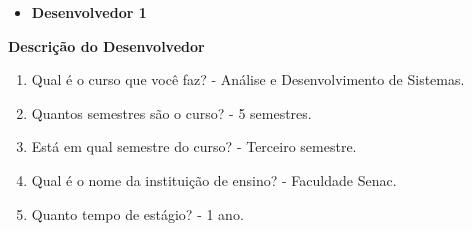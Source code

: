 \begin{anexosenv}
\begin{comment}
\begin{enumerate}
\setcounter{enumi}{25}
\item Como você testa as suas aplicações?\newline
- Resposta 1
\item Você costuma testar todas as páginas de aplicação que desenvolve?\newline
- Resposta 2
\item Você costuma armazenar os resultados dos testes que realiza?\newline
- Resposta 3
\item Você costuma a elaborar casos de testes para sua aplicação?\newline
- Resposta 4
\item Seria bom testes automatizados de interface para sua aplicação (selenium)?\newline
- Resposta 5
\end{enumerate}

\textbf{Implantação}

\begin{enumerate}
\setcounter{enumi}{30}
\item Você costuma migrar as definições dos objetos de banco (tabelas, sequences, views e
etc) junto com a aplicação?\newline
- Resposta 1
\item Você costuma verificar se os apelidos da aplicação de desenvolvimento e produção
estão iguais?\newline
- Resposta 2
\item Realiza uma navegação por todas as páginas da aplicação?\newline
- Resposta 3
\item Verifica se todas as tabelas foram criadas?\newline
- Resposta 4
\end{enumerate}
\end{comment}


\begin{itemize}
\item \textbf{Desenvolvedor 1}
\end{itemize}

\textbf{Descrição do Desenvolvedor}

\begin{enumerate}
\item Qual é o curso que você faz?\newline
- Análise e Desenvolvimento de Sistemas.
\item Quantos semestres são o curso?\newline
- 5 semestres.
\item Está em qual semestre do curso?\newline
- Terceiro semestre.
\item Qual é o nome da instituição de ensino?\newline
- Faculdade Senac.
\item Quanto tempo de estágio?\newline
- 1 ano.
\end{enumerate}


\end{anexosenv}
